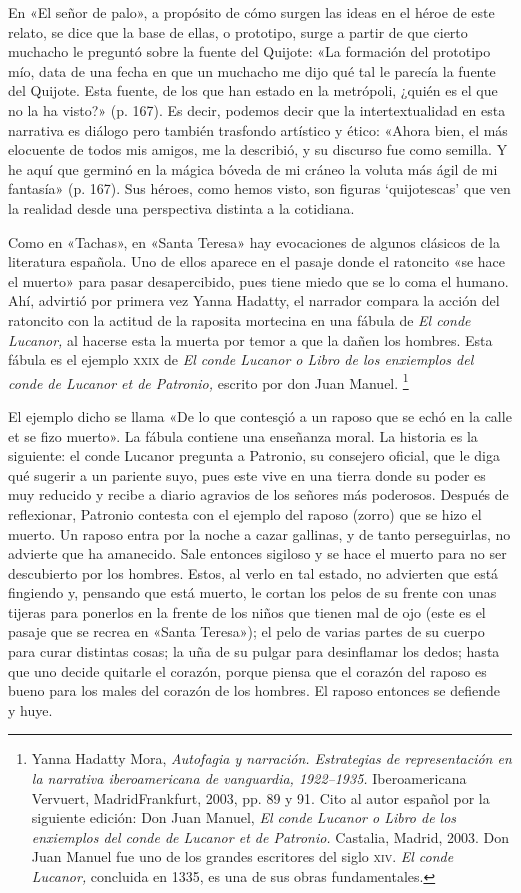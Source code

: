 \documentclass[14pt,twoside,final]{extbook} %
\let\oldfootnote\footnote
\renewcommand\footnote[1]{%
\oldfootnote{\hspace{1mm}#1}}
\begin{document}
En «El señor de palo», a propósito de cómo surgen las ideas en el héroe de este relato, se dice que la base de ellas, o prototipo, surge a partir de que cierto muchacho le preguntó sobre la fuente del Quijote: «La formación del prototipo mío, data de una fecha en que un muchacho me dijo qué tal le parecía la fuente del Quijote. Esta fuente, de los que han estado en la metrópoli, ¿quién es el que no la ha visto?» (p. 167). Es decir, podemos decir que la intertextualidad en esta narrativa es diálogo pero también trasfondo artístico y ético: «Ahora bien, el más elocuente de todos mis amigos, me la describió, y su discurso fue como semilla. Y he aquí que germinó en la mágica bóveda de mi cráneo la voluta más ágil de mi fantasía» (p. 167). Sus héroes, como hemos visto, son figuras `quijotescas' que ven la realidad desde una perspectiva distinta a la cotidiana.

Como en «Tachas», en «Santa Teresa» hay evocaciones de algunos clásicos de la literatura española. Uno de ellos aparece en el pasaje donde el ratoncito «se hace el muerto» para pasar
desapercibido, pues tiene miedo que se lo coma el humano. Ahí, advirtió por primera vez Yanna Hadatty, el narrador compara la acción del ratoncito con la actitud de la raposita mortecina en una fábula de \emph{El conde Lucanor,} al hacerse esta la muerta por temor a que la dañen los hombres. Esta fábula es el ejemplo \textsc{xxix} de \emph{El conde Lucanor o Libro de los enxiemplos del conde de Lucanor et de Patronio,} escrito por don Juan Manuel.\footnote{Yanna Hadatty Mora, \emph{Autofagia y narración. Estrategias de representación en la narrativa iberoamericana de vanguardia, 1922--1935.} Iberoamericana Vervuert, Madrid\kernedslash Frankfurt, 2003, pp. 89 y 91. Cito al autor español por la siguiente edición: Don Juan Manuel, \emph{El conde Lucanor o Libro de los enxiemplos del conde de Lucanor et de Patronio.} Castalia, Madrid, 2003. Don Juan Manuel fue uno de los grandes escritores del siglo \textsc{xiv}. \emph{El conde Lucanor,} concluida en 1335, es una de sus obras fundamentales.}

El ejemplo dicho se llama «De lo que contesçió a un raposo que se echó en la calle et se fizo muerto». La fábula contiene una enseñanza moral. La historia es la siguiente: el conde Lucanor pregunta a Patronio, su consejero oficial, que le diga qué sugerir a un pariente suyo, pues este vive en una tierra donde su poder es muy reducido y recibe a diario agravios de los señores más poderosos. Después de reflexionar, Patronio contesta con el ejemplo del raposo (zorro) que se hizo el muerto. Un raposo entra por la noche a cazar gallinas, y de tanto perseguirlas, no advierte que ha amanecido. Sale entonces sigiloso y se hace el muerto para no ser descubierto por los hombres. Estos, al verlo en tal estado, no advierten que está fingiendo y, pensando que está muerto, le cortan los pelos de su frente con unas tijeras para ponerlos en la frente de los niños que tienen mal de ojo (este es el pasaje que se recrea en «Santa Teresa»); el pelo de varias partes de su cuerpo para curar distintas cosas; la uña de su pulgar para desinflamar los dedos; hasta que uno decide quitarle el corazón, porque piensa que el corazón del raposo es bueno para los males del corazón de los hombres. El raposo entonces se defiende y huye.
\end{document}
